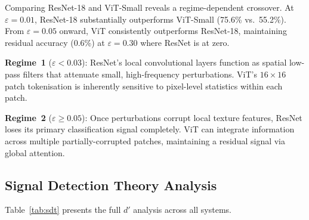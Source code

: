 \documentclass[12pt,a4paper]{article}
\begin{document}
Comparing ResNet-18 and ViT-Small reveals a regime-dependent crossover.
At $\varepsilon{=}0.01$, ResNet-18 substantially outperforms ViT-Small
(75.6\% vs.\ 55.2\%).
From $\varepsilon{=}0.05$ onward, ViT consistently outperforms ResNet-18,
maintaining residual accuracy (0.6\%) at $\varepsilon{=}0.30$ where ResNet
is at zero.

\textbf{Regime~1} ($\varepsilon < 0.03$): ResNet's local convolutional layers
function as spatial low-pass filters that attenuate small, high-frequency
perturbations. ViT's $16{\times}16$ patch tokenisation is inherently sensitive
to pixel-level statistics within each patch.

\textbf{Regime~2} ($\varepsilon \geq 0.05$): Once perturbations corrupt local
texture features, ResNet loses its primary classification signal completely.
ViT can integrate information across multiple partially-corrupted patches,
maintaining a residual signal via global attention.

\subsection{Signal Detection Theory Analysis}

Table~\ref{tab:sdt} presents the full $d'$ analysis across all systems.
\end{document}

